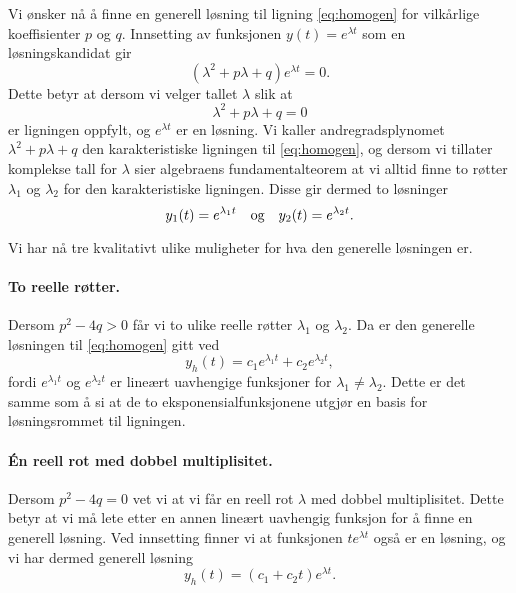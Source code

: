 \documentclass{article}
\theoremstyle{definition}
\theoremstyle{remark}
\begin{document}
\begin{multicols*}{2}
Vi ønsker nå å finne en generell løsning til ligning \eqref{eq:homogen} for vilkårlige koeffisienter $p$ og $q$. Innsetting av funksjonen $y(t) = e^{\lambda t}$ som en løsningskandidat gir
\begin{equation*}
  (\lambda^2 + p \lambda + q) e^{\lambda t} = 0.
\end{equation*}
Dette betyr at dersom vi velger tallet $\lambda$ slik at
\begin{equation*}
  \lambda^2 + p \lambda + q = 0  
\end{equation*}
er ligningen oppfylt, og $e^{\lambda t}$ er en løsning. Vi kaller andregradsplynomet $\lambda^2 + p \lambda + q$ den karakteristiske ligningen til \eqref{eq:homogen}, og dersom vi tillater komplekse tall for $\lambda$ sier algebraens fundamentalteorem at vi alltid finne to røtter $\lambda_1$ og $\lambda_2$ for den karakteristiske ligningen. Disse gir dermed to løsninger
\begin{equation*}
  y_1(t) = e^{\lambda_1 t}\ \ \textnormal{ og }\ \ y_2(t) = e^{\lambda_2 t}.
\end{equation*}

Vi har nå tre kvalitativt ulike muligheter for hva den generelle løsningen er.

\paragraph*{To reelle røtter.} Dersom $p^2 - 4q > 0$ får vi to ulike reelle røtter $\lambda_1$ og $\lambda_2$. Da er den generelle løsningen til \eqref{eq:homogen} gitt ved
\begin{equation*}
  y_h(t) = c_1 e^{\lambda_1 t} + c_2 e^{\lambda_2 t},
\end{equation*}
fordi $e^{\lambda_1 t}$ og $e^{\lambda_2 t}$ er lineært uavhengige funksjoner for $\lambda_1 \neq \lambda_2$. Dette er det samme som å si at de to eksponensialfunksjonene utgjør en basis for løsningsrommet til ligningen.

\paragraph*{Én reell rot med dobbel multiplisitet.} Dersom $p^2 - 4q = 0$ vet vi at vi får en reell rot $\lambda$ med dobbel multiplisitet. Dette betyr at vi må lete etter en annen lineært uavhengig funksjon for å finne en generell løsning. Ved innsetting finner vi at funksjonen $te^{\lambda t}$ også er en løsning, og vi har dermed generell løsning
\begin{equation*}
  y_h(t) = (c_1 + c_2 t) e^{\lambda t}.
\end{equation*}


\end{multicols*}
\end{document}
